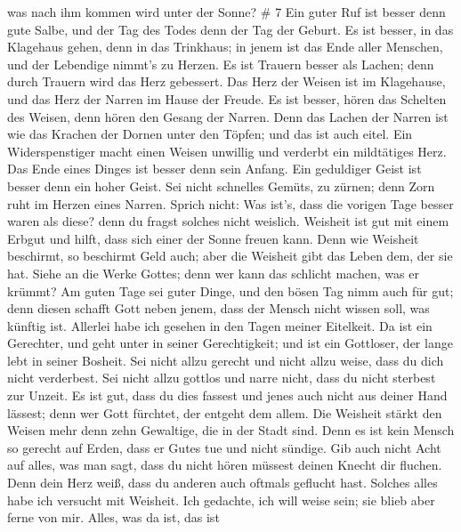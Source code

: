 was nach ihm kommen wird unter der Sonne? \# 7  Ein guter
Ruf ist besser denn gute Salbe, und der Tag des Todes denn der Tag der
Geburt.  Es ist besser, in das Klagehaus gehen, denn in das
Trinkhaus; in jenem ist das Ende aller Menschen, und der Lebendige
nimmt's zu Herzen.  Es ist Trauern besser als Lachen; denn
durch Trauern wird das Herz gebessert.  Das Herz der Weisen
ist im Klagehause, und das Herz der Narren im Hause der Freude.
 Es ist besser, hören das Schelten des Weisen, denn hören
den Gesang der Narren.  Denn das Lachen der Narren ist wie
das Krachen der Dornen unter den Töpfen; und das ist auch eitel.
 Ein Widerspenstiger macht einen Weisen unwillig und
verderbt ein mildtätiges Herz.  Das Ende eines Dinges ist
besser denn sein Anfang. Ein geduldiger Geist ist besser denn ein hoher
Geist.  Sei nicht schnelles Gemüts, zu zürnen; denn Zorn
ruht im Herzen eines Narren.  Sprich nicht: Was ist's, dass
die vorigen Tage besser waren als diese? denn du fragst solches nicht
weislich.  Weisheit ist gut mit einem Erbgut und hilft,
dass sich einer der Sonne freuen kann.  Denn wie Weisheit
beschirmt, so beschirmt Geld auch; aber die Weisheit gibt das Leben dem,
der sie hat.  Siehe an die Werke Gottes; denn wer kann das
schlicht machen, was er krümmt?  Am guten Tage sei guter
Dinge, und den bösen Tag nimm auch für gut; denn diesen schafft Gott
neben jenem, dass der Mensch nicht wissen soll, was künftig ist.
 Allerlei habe ich gesehen in den Tagen meiner Eitelkeit.
Da ist ein Gerechter, und geht unter in seiner Gerechtigkeit; und ist
ein Gottloser, der lange lebt in seiner Bosheit.  Sei nicht
allzu gerecht und nicht allzu weise, dass du dich nicht verderbest.
 Sei nicht allzu gottlos und narre nicht, dass du nicht
sterbest zur Unzeit.  Es ist gut, dass du dies fassest und
jenes auch nicht aus deiner Hand lässest; denn wer Gott fürchtet, der
entgeht dem allem.  Die Weisheit stärkt den Weisen mehr
denn zehn Gewaltige, die in der Stadt sind.  Denn es ist
kein Mensch so gerecht auf Erden, dass er Gutes tue und nicht sündige.
 Gib auch nicht Acht auf alles, was man sagt, dass du nicht
hören müssest deinen Knecht dir fluchen.  Denn dein Herz
weiß, dass du anderen auch oftmals geflucht hast.  Solches
alles habe ich versucht mit Weisheit. Ich gedachte, ich will weise sein;
sie blieb aber ferne von mir.  Alles, was da ist, das ist
